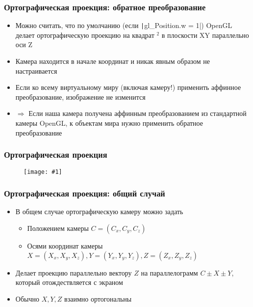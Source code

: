 \documentclass[10pt]{beamer}
\newcommand{\slideimage}[1]{
  \begin{figure}
    \begin{adjustbox}{width=\textwidth, totalheight=\textheight-2\baselineskip-2\baselineskip,keepaspectratio}
      \texttt{[image: \#1]}
    \end{adjustbox}
  \end{figure}
}
\begin{document}
\begin{frame}[fragile]
\frametitle{Ортографическая проекция: обратное преобразование}
\begin{itemize}
\item Можно считать, что по умолчанию (если \texttt|gl_Position.w = 1|) OpenGL делает ортографическую проекцию на квадрат \begin{math}[-1, 1]^2\end{math} в плоскости XY параллельно оси Z
\pause
\item Камера находится в начале координат и никак явным образом не настраивается
\pause
\item Если ко всему виртуальному миру (включая камеру!) применить аффинное преобразование, изображение не изменится
\pause
\item \begin{math}\Longrightarrow\end{math} Если наша камера получена аффинным преобразованием из стандартной камеры OpenGL, к объектам мира нужно применить обратное преобразование
\end{itemize}
\end{frame}

\begin{frame}[fragile]
\frametitle{Ортографическая проекция}
\slideimage{orthographic.png}
\end{frame}

\begin{frame}[fragile]
\frametitle{Ортографическая проекция: общий случай}
\begin{itemize}
\item В общем случае ортографическую камеру можно задать
\pause
\begin{itemize}
\item Положением камеры \begin{math}C = (C_x, C_y, C_z)\end{math}
\pause
\item Осями координат камеры \begin{math}X = (X_x, X_y, X_z), Y = (Y_x, Y_y, Y_z), Z = (Z_x, Z_y, Z_z)\end{math}
\end{itemize}
\pause
\item Делает проекцию параллельно вектору \begin{math}Z\end{math} на параллелограмм \begin{math}C \pm X \pm Y\end{math}, который отождествляется с экраном
\pause
\item Обычно \begin{math}X, Y, Z\end{math} взаимно ортогональны
\end{itemize}
\end{frame}
\end{document}
